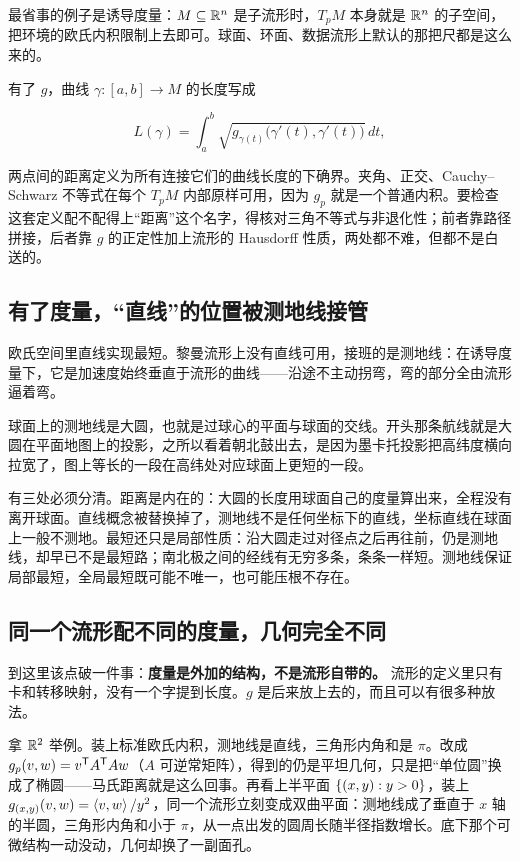 最省事的例子是诱导度量：\(M\subseteq\mathbb{R}^{n}\) 是子流形时，\(T_{p}M\) 本身就是 \(\mathbb{R}^{n}\) 的子空间，把环境的欧氏内积限制上去即可。球面、环面、数据流形上默认的那把尺都是这么来的。

有了 \(g\)，曲线 \(\gamma:[a,b]\to M\) 的长度写成

\[
L(\gamma)=\int_{a}^{b}\sqrt{g_{\gamma(t)}\bigl(\gamma'(t),\gamma'(t)\bigr)}\,dt,
\]

两点间的距离定义为所有连接它们的曲线长度的下确界。夹角、正交、Cauchy--Schwarz 不等式在每个 \(T_{p}M\) 内部原样可用，因为 \(g_{p}\) 就是一个普通内积。要检查这套定义配不配得上``距离''这个名字，得核对三角不等式与非退化性；前者靠路径拼接，后者靠 \(g\) 的正定性加上流形的 Hausdorff 性质，两处都不难，但都不是白送的。

\subsection{有了度量，``直线''的位置被测地线接管}

欧氏空间里直线实现最短。黎曼流形上没有直线可用，接班的是测地线：在诱导度量下，它是加速度始终垂直于流形的曲线——沿途不主动拐弯，弯的部分全由流形逼着弯。

球面上的测地线是大圆，也就是过球心的平面与球面的交线。开头那条航线就是大圆在平面地图上的投影，之所以看着朝北鼓出去，是因为墨卡托投影把高纬度横向拉宽了，图上等长的一段在高纬处对应球面上更短的一段。

有三处必须分清。距离是内在的：大圆的长度用球面自己的度量算出来，全程没有离开球面。直线概念被替换掉了，测地线不是任何坐标下的直线，坐标直线在球面上一般不测地。最短还只是局部性质：沿大圆走过对径点之后再往前，仍是测地线，却早已不是最短路；南北极之间的经线有无穷多条，条条一样短。测地线保证局部最短，全局最短既可能不唯一，也可能压根不存在。

\subsection{同一个流形配不同的度量，几何完全不同}

到这里该点破一件事：\textbf{度量是外加的结构，不是流形自带的。} 流形的定义里只有卡和转移映射，没有一个字提到长度。\(g\) 是后来放上去的，而且可以有很多种放法。

拿 \(\mathbb{R}^{2}\) 举例。装上标准欧氏内积，测地线是直线，三角形内角和是 \(\pi\)。改成 \(g_{p}(v,w)=v^{\mathsf{T}}A^{\mathsf{T}}Aw\)（\(A\) 可逆常矩阵），得到的仍是平坦几何，只是把``单位圆''换成了椭圆——马氏距离就是这么回事。再看上半平面 \(\left\{(x,y):y>0\right\}\)，装上 \(g_{(x,y)}(v,w)=\left\langle v,w\right\rangle/y^{2}\)，同一个流形立刻变成双曲平面：测地线成了垂直于 \(x\) 轴的半圆，三角形内角和小于 \(\pi\)，从一点出发的圆周长随半径指数增长。底下那个可微结构一动没动，几何却换了一副面孔。


